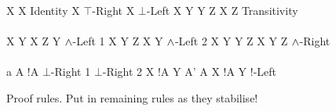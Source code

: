 \begin{FIGURE}
\begin{RULES}

  \ZEROPREMISERULENAMEDRIGHT
  {
    X \judge X
  }{Identity}
    \quad
  \ZEROPREMISERULENAMEDRIGHT
  {
    X \judge \top
  }{$\top$-Right}
    \quad
  \ZEROPREMISERULENAMEDRIGHT
  {
    \bot \judge X
  }{$\bot$-Left}
    \quad
  \TWOPREMISERULENAMEDRIGHT
  {
    X \judge Y
  }
  {
    Y \judge Z
  }
  {
    X \judge Z
  }{Transitivity}
    \\\\
  \ONEPREMISERULENAMEDRIGHT
  {
    X \judge Y
  }
  {
    X \AND Z \judge Y
  }{$\land$-Left 1}
     \quad
  \ONEPREMISERULENAMEDRIGHT
  {
    X \judge Y
  }
  {
    Z \AND X  \judge Y
  }{$\land$-Left 2}
     \quad
  \TWOPREMISERULENAMEDRIGHT
  {
    X \judge Y
  }
  {
    Y \judge Z
  }
  {
    X \judge Y \AND Z
  }{$\land$-Right}
     \\\\
     \ONEPREMISERULENAMEDRIGHT
     {
       a \notin A
     }
     {
       !A \AND {} \judge \bot
     }{$\bot$-Right 1}
        \quad
     \ZEROPREMISERULENAMEDRIGHT
     {
        \judge \bot
     }{$\bot$-Right 2}
        \quad
     \TWOPREMISERULENAMEDRIGHT
     {
       X \AND !A \judge Y
     }
     {
       A' \subseteq A
     }
     {
       X \AND !A \judge Y
     }{!-Left}
\end{RULES}
\caption{Proof rules. Put in remaining rules as they stabilise!}\label{figure:elAndBangRules}
\end{FIGURE}
